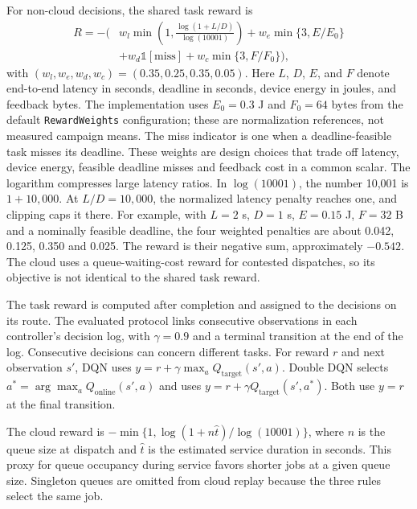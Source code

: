 For non-cloud decisions, the shared task reward is
\begin{equation}
\begin{aligned}
R=-\bigg(&w_l\min\left(1,\frac{\log(1+L/D)}{\log(10001)}\right)
+w_e\min\{3,E/E_0\}\\
&+w_d\mathbb{1}[\mathrm{miss}]
+w_c\min\{3,F/F_0\}\bigg),
\end{aligned}
\end{equation}
with $(w_l,w_e,w_d,w_c)=(0.35,0.25,0.35,0.05)$. Here $L$, $D$, $E$, and
$F$ denote end-to-end latency in seconds, deadline in seconds, device energy
in joules, and feedback bytes. The implementation uses $E_0=0.3$ J and
$F_0=64$ bytes from the default \texttt{RewardWeights} configuration; these
are normalization references, not measured campaign means. The miss indicator
is one when a deadline-feasible task misses its deadline. These weights
are design choices that trade off latency, device energy, feasible
deadline misses and feedback cost in a common scalar. The logarithm
compresses large latency ratios. In $\log(10001)$, the number 10,001
is $1+10{,}000$. At $L/D=10{,}000$, the normalized latency penalty
reaches one, and clipping caps it there. For example, with $L=2$ s,
$D=1$ s, $E=0.15$ J, $F=32$ B and a nominally feasible deadline, the
four weighted penalties are about 0.042, 0.125, 0.350 and 0.025.
The reward is their negative sum, approximately $-0.542$.
The cloud uses a
queue-waiting-cost reward for contested dispatches, so its objective is not
identical to the shared task reward.

The task reward is computed after completion and assigned to the decisions
on its route. The evaluated protocol links consecutive observations in each
controller's decision log, with $\gamma=0.9$ and a terminal transition
at the end of the log. Consecutive decisions can concern different tasks.
For reward $r$ and next observation $s'$, DQN uses
$y=r+\gamma\max_a Q_{\mathrm{target}}(s',a)$.
Double DQN selects $a^*=\arg\max_a Q_{\mathrm{online}}(s',a)$ and uses
$y=r+\gamma Q_{\mathrm{target}}(s',a^*)$. Both use $y=r$ at the final
transition.

The cloud reward is $-\min\{1,\log(1+n\hat t)/\log(10001)\}$,
where $n$ is the queue size at dispatch and $\hat t$ is the estimated
service duration in seconds. This proxy for queue occupancy during
service favors shorter jobs at a given queue size. Singleton queues are
omitted from cloud replay because the three rules select the same job.
